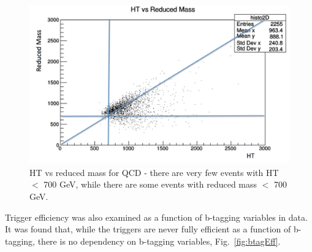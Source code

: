 \begin{figure}[thb!]
\begin{center}
\includegraphics[scale=0.35]{Figures/HTvsredm.pdf}
\end{center}
\caption{HT vs reduced mass for QCD - there are very few events with HT $<$ 700 GeV, while there are some events with reduced mass $<$ 700 GeV.}
\label{fig:2DHTredm}
\end{figure}

Trigger efficiency was also examined as a function of b-tagging variables in data. It was found that, while the triggers are never fully efficient as a function of b-tagging, there is no dependency on b-tagging variables, Fig.~\ref{fig:btagEff}.


